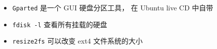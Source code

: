 
\begin{issues}
\issueDraft
\end{issues}

\begin{itemize}
\item \verb|Gparted| 是一个 GUI 硬盘分区工具， 在 Ubuntu live CD 中自带
\item \verb|fdisk -l| 查看所有挂载的硬盘
\item \verb|resize2fs| 可以改变 ext4 文件系统的大小
\end{itemize}

